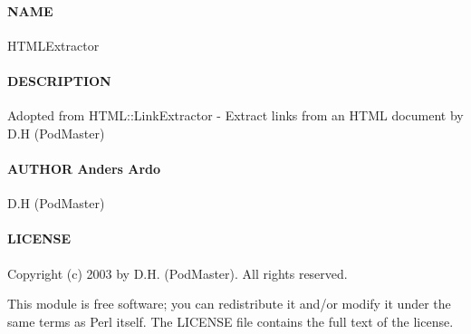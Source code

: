 \paragraph{NAME\label{NAME}}


HTMLExtractor

\paragraph{DESCRIPTION\label{DESCRIPTION}}


Adopted from HTML::LinkExtractor - Extract links from an HTML document
by D.H (PodMaster)

\paragraph{AUTHOR
Anders Ardo\label{AUTHOR_Anders_Ardo}}


D.H (PodMaster)

\paragraph{LICENSE\label{LICENSE}}


Copyright (c) 2003 by D.H. (PodMaster).
All rights reserved.



This module is free software;
you can redistribute it and/or modify it under
the same terms as Perl itself.
The LICENSE file contains the full text of the license.

